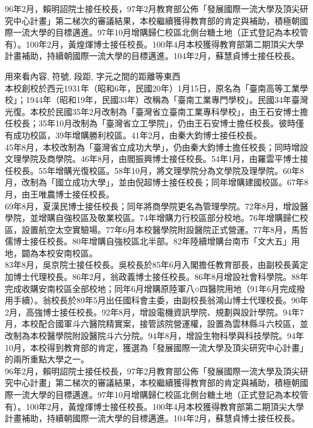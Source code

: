96年2月，賴明詔院士接任校長，97年2月教育部公佈「發展國際一流大學及頂尖研究中心計畫」第二梯次的審議結果，本校繼續獲得教育部的肯定與補助，積極朝國際一流大學的目標邁進。97年10月增購歸仁校區北側台糖土地（正式登記為本校管有）。100年2月，黃煌煇博士接任校長。100年4月本校獲得教育部第二期頂尖大學計畫補助，持續朝國際一流大學的目標邁進。104年2月，蘇慧貞博士接任校長。


\newpage
{}
用來看內容, 符號, 段距, 字元之間的距離等東西\\

本校創校於西元1931年（昭和6年，民國20年）1月15日，原名為「臺南高等工業學校」；1944年（昭和19年，民國33年）改稱為「臺南工業專門學校」。民國34年臺灣光復。本校於民國35年2月改制為「臺灣省立臺南工業專科學校」，由王石安博士擔任校長；35年10月改制為「臺灣省立工學院」，仍由王石安博士擔任校長。彼時僅有成功校區，39年增購勝利校區。41年2月，由秦大鈞博士接任校長。\\
45年8月，本校改制為「臺灣省立成功大學」，仍由秦大鈞博士擔任校長；同時增設文理學院及商學院。46年8月，由閻振興博士接任校長。54年1月，由羅雲平博士接任校長。55年增購光復校區。58年10月，將文理學院分為文學院及理學院。60年8月，改制為「國立成功大學」，並由倪超博士接任校長；同年增購建國校區。67年8月，由王唯農博士接任校長。\\
69年8月，夏漢民博士接任校長；同年將商學院更名為管理學院。72年8月，增設醫學院，並增購自強校區及敬業校區。74年增購力行校區部分校地。76年增購歸仁校區，設置航空太空實驗場。77年6月本校醫學院附設醫院正式營運。77年8月，馬哲儒博士接任校長。80年增購自強校區北半部。82年陸續增購台南市「文大五」用地，闢為本校安南校區。\\
83年8月，吳京院士接任校長。吳校長於85年6月入閣擔任教育部長，由副校長黃定加博士代理校長。86年2月，翁政義博士接任校長。86年8月增設社會科學院。88年完成收購安南校區全部校地；同年6月增購原陸軍八○四醫院用地（91年6月完成撥用手續）。翁校長於89年5月出任國科會主委，由副校長翁鴻山博士代理校長。90年2月，高強博士接任校長。92年8月，增設電機資訊學院、規劃與設計學院。94年7月，本校配合國軍斗六醫院精實案，接管該院營運權，設置為雲林縣斗六校區，並改制為本校醫學院附設醫院斗六分院。94年8月，增設生物科學與科技學院。94年10月，本校得到教育部的肯定，獲選為「發展國際一流大學及頂尖研究中心計畫」的兩所重點大學之一。\\
96年2月，賴明詔院士接任校長，97年2月教育部公佈「發展國際一流大學及頂尖研究中心計畫」第二梯次的審議結果，本校繼續獲得教育部的肯定與補助，積極朝國際一流大學的目標邁進。97年10月增購歸仁校區北側台糖土地（正式登記為本校管有）。100年2月，黃煌煇博士接任校長。100年4月本校獲得教育部第二期頂尖大學計畫補助，持續朝國際一流大學的目標邁進。104年2月，蘇慧貞博士接任校長。

